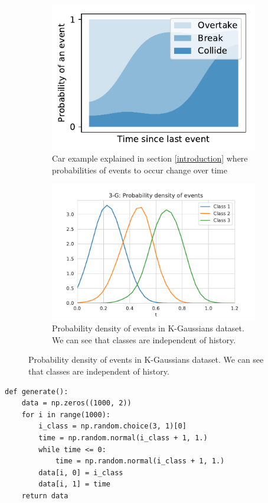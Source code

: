 \begin{figure}[H]
\centering
    \begin{subfigure}{.45\textwidth}
        \centering
    	\includegraphics[width=.8\linewidth]{sections/010_neurips2019/paper/images/categorical_evolution.pdf}
        \caption{Car example explained in section \ref{introduction} where probabilities of events to occur change over time}
    \label{fig:car_categorical}
    \end{subfigure}%
    \hspace*{10.mm}
    \begin{subfigure}{.45\textwidth}
        \centering
   		\includegraphics[width=.8 \linewidth]{sections/010_neurips2019/paper/images/k-gaussians-density.pdf}
		\caption{Probability density of events in K-Gaussians dataset. We can see that classes are independent of history.}\label{fig:k-gaussians-density}
    \end{subfigure}
\end{figure}

\begin{minipage}{\linewidth}
\begin{verbatim}
def generate():
    data = np.zeros((1000, 2))
    for i in range(1000):
        i_class = np.random.choice(3, 1)[0]
        time = np.random.normal(i_class + 1, 1.)
        while time <= 0:
            time = np.random.normal(i_class + 1, 1.)
        data[i, 0] = i_class
        data[i, 1] = time
    return data
\end{verbatim}
\end{minipage}

